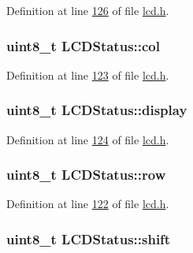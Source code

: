 Definition at line \hyperlink{lcd_8h_source_l00126}{126} of file \hyperlink{lcd_8h_source}{lcd.\-h}.

\hypertarget{struct_l_c_d_status_a79a5d5cb370566c8638d9a3866ff8e6b}{
\subsubsection[{col}]{\setlength{\rightskip}{0pt plus 5cm}uint8\-\_\-t L\-C\-D\-Status\-::col}}\label{struct_l_c_d_status_a79a5d5cb370566c8638d9a3866ff8e6b}


Definition at line \hyperlink{lcd_8h_source_l00123}{123} of file \hyperlink{lcd_8h_source}{lcd.\-h}.

\hypertarget{struct_l_c_d_status_a844c7ce7851d43e9459d28c2e93d715a}{
\subsubsection[{display}]{\setlength{\rightskip}{0pt plus 5cm}uint8\-\_\-t L\-C\-D\-Status\-::display}}\label{struct_l_c_d_status_a844c7ce7851d43e9459d28c2e93d715a}


Definition at line \hyperlink{lcd_8h_source_l00124}{124} of file \hyperlink{lcd_8h_source}{lcd.\-h}.

\hypertarget{struct_l_c_d_status_a1032713b3106af056748cc1766bbf67f}{
\subsubsection[{row}]{\setlength{\rightskip}{0pt plus 5cm}uint8\-\_\-t L\-C\-D\-Status\-::row}}\label{struct_l_c_d_status_a1032713b3106af056748cc1766bbf67f}


Definition at line \hyperlink{lcd_8h_source_l00122}{122} of file \hyperlink{lcd_8h_source}{lcd.\-h}.

\hypertarget{struct_l_c_d_status_ad69f767818d8a15e1fd6935e07df3770}{
\subsubsection[{shift}]{\setlength{\rightskip}{0pt plus 5cm}uint8\-\_\-t L\-C\-D\-Status\-::shift}}\label{struct_l_c_d_status_ad69f767818d8a15e1fd6935e07df3770}


